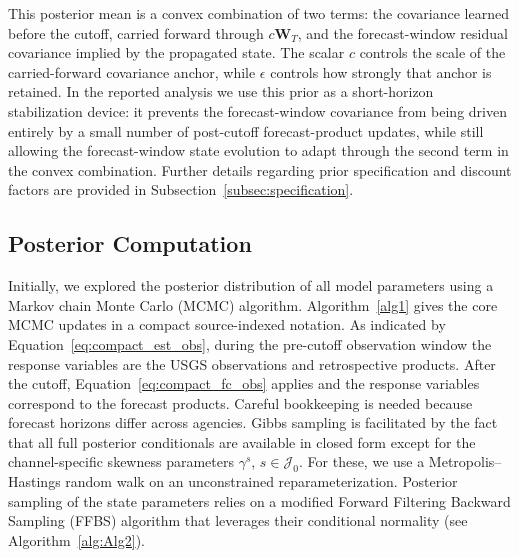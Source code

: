 \documentclass[APA,STIX1COL]{WileyNJD-v2}
\begin{document}
This posterior mean is a convex combination of two terms: the covariance learned before the cutoff, carried forward through \(c\mathbf{W}_T\), and the forecast-window residual covariance implied by the propagated state. The scalar \(c\) controls the scale of the carried-forward covariance anchor, while \(\epsilon\) controls how strongly that anchor is retained. In the reported analysis we use this prior as a short-horizon stabilization device: it prevents the forecast-window covariance from being driven entirely by a small number of post-cutoff forecast-product updates, while still allowing the forecast-window state evolution to adapt through the second term in the convex combination.
Further details regarding prior specification and discount factors are provided in Subsection~\ref{subsec:specification}.

\subsection{Posterior Computation}
\label{subsec:postinf}
Initially, we explored the posterior distribution of all model parameters using a Markov chain Monte Carlo (MCMC) algorithm.
Algorithm~\ref{alg1} gives the core MCMC updates in a compact source-indexed notation. As indicated by Equation~\ref{eq:compact_est_obs}, during the pre-cutoff observation window the response variables are the USGS observations and retrospective products. After the cutoff, Equation~\ref{eq:compact_fc_obs} applies and the response variables correspond to the forecast products. Careful bookkeeping is needed because forecast horizons differ across agencies. Gibbs sampling is facilitated by the fact that all full posterior conditionals are available in closed form except for the channel-specific skewness parameters \(\gamma^s\), \(s\in\mathcal{J}_0\). For these, we use a Metropolis--Hastings random walk on an unconstrained reparameterization. Posterior sampling of the state parameters relies on a modified Forward Filtering Backward Sampling (FFBS) algorithm that leverages their conditional normality (see Algorithm~\ref{alg:Alg2}).

\end{document}
